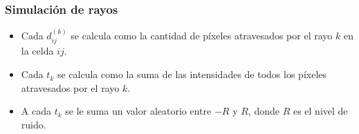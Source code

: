 \documentclass{beamer}
\begin{document}
\begin{frame}
\frametitle{Simulación de rayos}
\begin{itemize}
\item<1-> Cada $d_{ij}^{(k)}$ se calcula como la cantidad de píxeles atravesados por el rayo $k$ en la celda $ij$.
\item<2-> Cada $t_k$ se calcula como la suma de las intensidades de todos los píxeles atravesados por el rayo $k$.
\item<3-> A cada $t_k$ se le suma un valor aleatorio entre $-R$ y $R$, donde $R$ es el nivel de ruido.
\end{itemize}
\end{frame}



\end{document}
